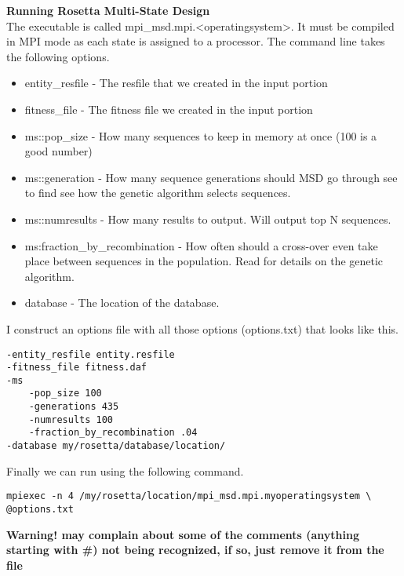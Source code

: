 \textbf{Running Rosetta Multi-State Design} \\
The \rosetta executable is called mpi\_msd.mpi.<operatingsystem>. It must be compiled in MPI mode as each state is assigned to a processor. The command line takes the following options.

\begin{itemize}
\item entity\_resfile - The resfile that we created in the input portion
\item fitness\_file - The fitness file we created in the input portion
\item ms::pop\_size - How many sequences to keep in memory at once (100 is a good number)
\item ms::generation - How many sequence generations should MSD go through see \citep{LeaverFay:2011ji} to find see how the genetic algorithm selects sequences.
\item ms::numresults - How many results to output. Will output top N sequences.
\item ms:fraction\_by\_recombination - How often should a cross-over even take place between sequences in the population. Read \citep{LeaverFay:2011ji} for details on the genetic algorithm.
\item database - The location of the database.
\end{itemize}

I construct an options file with all those options (options.txt) that looks like this.

\begin{lstlisting}
-entity_resfile entity.resfile
-fitness_file fitness.daf
-ms
    -pop_size 100
    -generations 435
    -numresults 100
    -fraction_by_recombination .04
-database my/rosetta/database/location/
\end{lstlisting}

Finally we can run \rosetta using the following command.

\begin{lstlisting}
mpiexec -n 4 /my/rosetta/location/mpi_msd.mpi.myoperatingsystem \
@options.txt
\end{lstlisting}
\textbf{Warning! \linebreak \rosetta may complain about some of the comments (anything starting with \#) not being recognized, if so, just remove it from the file}
